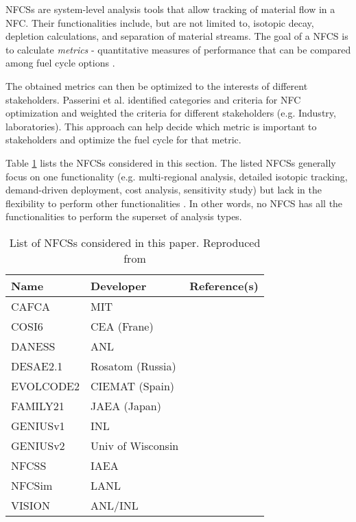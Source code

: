 \glspl{NFCS} are system-level analysis tools
that allow tracking of material flow in a \gls{NFC}. Their
functionalities include, but are not limited to, isotopic decay,
depletion calculations, and separation of material streams.
The goal of a \gls{NFCS} is to calculate \textit{metrics} - quantitative
measures of performance that can be compared among fuel cycle
options \cite{huff_fundamental_2016}.

The obtained metrics can then be optimized to the interests
of different stakeholders. Passerini et al. \cite{passerini_systematic_2014}
identified categories and criteria for \gls{NFC} optimization and
weighted the criteria for different stakeholders (e.g. Industry, laboratories).
This approach can help decide which metric is important to stakeholders
and optimize the fuel cycle for that metric.

Table \ref{tab:fcs} lists the \glspl{NFCS}
considered in this section. The listed \glspl{NFCS}
generally focus on one functionality
(e.g. multi-regional analysis, detailed isotopic tracking,
demand-driven deployment, cost analysis, sensitivity study)
but lack in the flexibility to perform other
functionalities \cite{huff_next_2010}. In
other words, no \gls{NFCS} has all the functionalities to
perform the superset of analysis types.

\begin{table}[h]
    \centering
    \caption{List of \glspl{NFCS} considered in this paper.
             Reproduced from \cite{huff_next_2010}}
    \label{tab:fcs}
    \begin{tabular}{lll}
        \hline
        Name & Developer & Reference(s) \\
        \hline
        CAFCA & MIT & \cite{guerin_benchmark_2009}\\
        COSI6 & CEA (Frane) & \cite{meyer_new_2009} \\
        DANESS & ANL & \cite{van_den_durpel_daness:_2006}\\
        DESAE2.1 & Rosatom (Russia) & \cite{tsibulskiy_desae_2006}\\
        EVOLCODE2 & CIEMAT (Spain) & \cite{alvarez-velarde_validation_2014}\\
        FAMILY21 & JAEA (Japan) & \cite{oecd_nuclear_2009}\\
        GENIUSv1 & INL & \cite{dunzik-gougar_global_2007}\\
        GENIUSv2 & Univ of Wisconsin & \cite{dunn_genius_2009}\\
        NFCSS & IAEA & \cite{iaea_guidance_2008}\\
        NFCSim & LANL & \cite{schneider_nfcsim:_2005} \\
        VISION & ANL/INL & \cite{jacobson_verifiable_2010} \\
        \hline
    \end{tabular}
\end{table}


